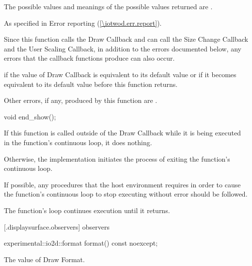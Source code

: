 \begin{itemdescr}
\pnum
\returns
The possible values and meanings of the possible values returned are .

\pnum
\throws
As specified in Error reporting (\ref{\iotwod.err.report}).

\pnum
\remarks
Since this function calls the Draw Callback and can call the Size Change Callback and the User Scaling Callback, in addition to the errors documented below, any errors that the callback functions produce can also occur.

\pnum
\errors
\pnum
{} if the value of Draw Callback is equivalent to its default value or if it becomes equivalent to its default value before this function returns.

\pnum
Other errors, if any, produced by this function are .
\end{itemdescr}

\begin{itemdecl}
void end_show();
\end{itemdecl}
\begin{itemdescr}
\pnum
\effects
If this function is called outside of the Draw Callback while it is being executed in the  function's continuous loop, it does nothing.

\pnum
Otherwise, the implementation initiates the process of exiting the  function's continuous loop.

\pnum
If possible, any procedures that the host environment requires in order to cause the  function's continuous loop to stop executing without error should be followed.

\pnum
The  function's loop continues execution until it returns.
\end{itemdescr}

 [\iotwod.displaysurface.observers]{ observers}

\begin{itemdecl}
experimental::io2d::format format() const noexcept;
\end{itemdecl}
\begin{itemdescr}
\pnum
\returns
The value of Draw Format.
\end{itemdescr}

